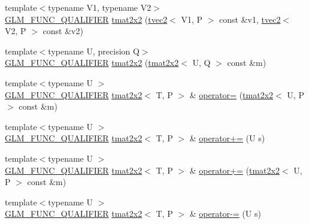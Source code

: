\begin{DoxyCompactItemize}
\item 
{\footnotesize template$<$typename V1, typename V2$>$ }\\\hyperlink{setup_8hpp_a33fdea6f91c5f834105f7415e2a64407}{G\+L\+M\+\_\+\+F\+U\+N\+C\+\_\+\+Q\+U\+A\+L\+I\+F\+I\+ER} \hyperlink{structglm_1_1detail_1_1tmat2x2_a469a15bf38fd19d4f7ad48f8599ea554}{tmat2x2} (\hyperlink{structglm_1_1detail_1_1tvec2}{tvec2}$<$ V1, P $>$ const \&v1, \hyperlink{structglm_1_1detail_1_1tvec2}{tvec2}$<$ V2, P $>$ const \&v2)
\item 
{\footnotesize template$<$typename U, precision Q$>$ }\\\hyperlink{setup_8hpp_a33fdea6f91c5f834105f7415e2a64407}{G\+L\+M\+\_\+\+F\+U\+N\+C\+\_\+\+Q\+U\+A\+L\+I\+F\+I\+ER} \hyperlink{structglm_1_1detail_1_1tmat2x2_a0eed2a609688233e8c0f3abe1e32d036}{tmat2x2} (\hyperlink{structglm_1_1detail_1_1tmat2x2}{tmat2x2}$<$ U, Q $>$ const \&m)
\item 
{\footnotesize template$<$typename U $>$ }\\\hyperlink{setup_8hpp_a33fdea6f91c5f834105f7415e2a64407}{G\+L\+M\+\_\+\+F\+U\+N\+C\+\_\+\+Q\+U\+A\+L\+I\+F\+I\+ER} \hyperlink{structglm_1_1detail_1_1tmat2x2}{tmat2x2}$<$ T, P $>$ \& \hyperlink{structglm_1_1detail_1_1tmat2x2_a08aa9a6143024b1c562f717273dbec95}{operator=} (\hyperlink{structglm_1_1detail_1_1tmat2x2}{tmat2x2}$<$ U, P $>$ const \&m)
\item 
{\footnotesize template$<$typename U $>$ }\\\hyperlink{setup_8hpp_a33fdea6f91c5f834105f7415e2a64407}{G\+L\+M\+\_\+\+F\+U\+N\+C\+\_\+\+Q\+U\+A\+L\+I\+F\+I\+ER} \hyperlink{structglm_1_1detail_1_1tmat2x2}{tmat2x2}$<$ T, P $>$ \& \hyperlink{structglm_1_1detail_1_1tmat2x2_a4168898bfdd14fbbbaa72a36ceb1514b}{operator+=} (U s)
\item 
{\footnotesize template$<$typename U $>$ }\\\hyperlink{setup_8hpp_a33fdea6f91c5f834105f7415e2a64407}{G\+L\+M\+\_\+\+F\+U\+N\+C\+\_\+\+Q\+U\+A\+L\+I\+F\+I\+ER} \hyperlink{structglm_1_1detail_1_1tmat2x2}{tmat2x2}$<$ T, P $>$ \& \hyperlink{structglm_1_1detail_1_1tmat2x2_a907826d7a4cc2e34f772eaf6ec95c2cf}{operator+=} (\hyperlink{structglm_1_1detail_1_1tmat2x2}{tmat2x2}$<$ U, P $>$ const \&m)
\item 
{\footnotesize template$<$typename U $>$ }\\\hyperlink{setup_8hpp_a33fdea6f91c5f834105f7415e2a64407}{G\+L\+M\+\_\+\+F\+U\+N\+C\+\_\+\+Q\+U\+A\+L\+I\+F\+I\+ER} \hyperlink{structglm_1_1detail_1_1tmat2x2}{tmat2x2}$<$ T, P $>$ \& \hyperlink{structglm_1_1detail_1_1tmat2x2_a0e107a55fa775eb6e5f608ab3d6d67b5}{operator-\/=} (U s)

\end{DoxyCompactItemize}
